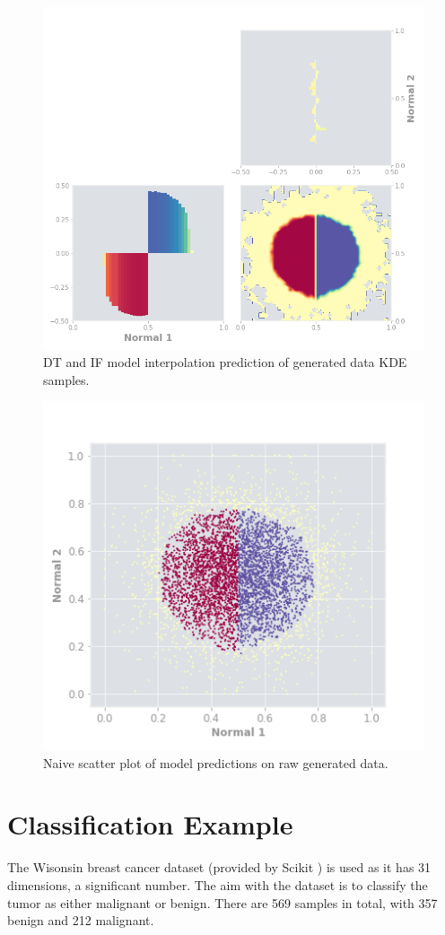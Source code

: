 \documentclass[a4paper, oneside, twocolumn]{article}
\begin{document}
\begin{figure}
\centering
\includegraphics[width=0.8\columnwidth]{img/gen_dt_if.png}
\caption{DT and IF model interpolation prediction of generated data KDE samples.}
\label{fig:gen-dt-if}
\end{figure}

\begin{figure}
\centering
\includegraphics[width=0.6\columnwidth]{img/gen_scat.png}
\caption{Naive scatter plot of model predictions on raw generated data.}
\label{fig:gen-scat}
\end{figure}

\section{Classification Example}

The Wisonsin breast cancer dataset \cite{breastcancer} (provided by Scikit \cite{pedregosa2011scikit}) is used as it has 31 dimensions, a significant number. The aim with the dataset is to classify the tumor as either malignant or benign. There are 569 samples in total, with 357 benign and 212 malignant.
\end{document}
